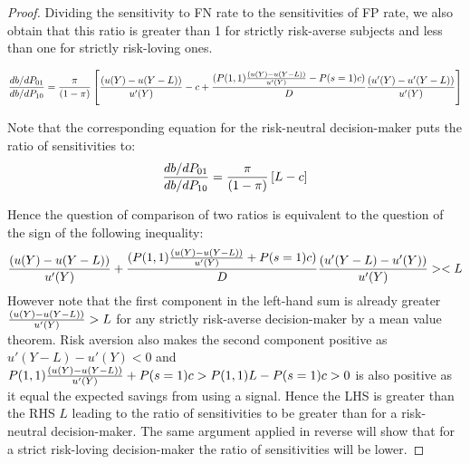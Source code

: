 \documentclass[12pt,a4paper]{article}
\begin{document}
\begin{proof}
Dividing the sensitivity to FN rate to the sensitivities of FP rate, we also obtain that this ratio is greater than 1 for strictly risk-averse subjects and less than one for strictly risk-loving ones. 

\[{db/dP_{01} \over db/dP_{10}}={\pi \over (1-\pi)} \left[{(u(Y)-u(Y-L)) \over u'(Y)}-c +{(P(1,1){(u(Y)-u(Y-L)) \over u'(Y)}-P(s=1)c) \over D}{(u'(Y)-u'(Y-L))\over u'(Y)}  \right] \]

Note that the corresponding equation for the risk-neutral decision-maker puts the ratio of sensitivities to:
\[{db/dP_{01} \over db/dP_{10}}= {\pi \over (1-\pi)} \left[L-c \right] \]

Hence the question of comparison of two ratios is equivalent to the question of the sign of the following inequality:
\[{(u(Y)-u(Y-L)) \over u'(Y)}+{(P(1,1){(u(Y)-u(Y-L)) \over u'(Y)}+P(s=1)c) \over D}{(u'(Y-L)-u'(Y))\over u'(Y)}><L\]
However note that the first component in the left-hand sum is already greater ${(u(Y)-u(Y-L)) \over u'(Y)}>L$ for any strictly risk-averse decision-maker by a mean value theorem. Risk aversion also makes the second component positive as  $u'(Y-L)-u'(Y)<0$ and $P(1,1){(u(Y)-u(Y-L)) \over u'(Y)}+P(s=1)c>P(1,1)L-P(s=1)c>0$ is also positive as it equal the expected savings from using a signal. Hence the LHS is greater than the RHS $L$ leading to the ratio of sensitivities to be greater than for a risk-neutral decision-maker. The same argument applied in reverse will show that for a strict risk-loving decision-maker the ratio of sensitivities will be lower. 
\end{proof}

\newpage
\end{document}
